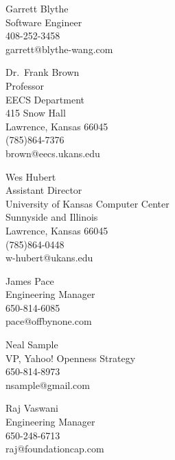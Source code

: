 \documentclass{resume}
\begin{document}
\address{
  {\tt mooreb@mooreb.com} \hfill 408-393-3124 (mobile) \hfill }

\begin{resume}

\begin{References}
\begin{reference}
Garrett Blythe \\
Software Engineer \\
408-252-3458 \\
garrett@blythe-wang.com \\
\end{reference}

\begin{reference}
Dr.\ Frank Brown \\
Professor \\
EECS Department \\
415 Snow Hall \\
Lawrence, Kansas 66045 \\
(785)864-7376 \\
brown@eecs.ukans.edu \\
\end{reference}

\begin{reference}
Wes Hubert \\
Assistant Director \\
University of Kansas Computer Center \\
Sunnyside and Illinois \\
Lawrence, Kansas 66045 \\
(785)864-0448 \\
w-hubert@ukans.edu \\
\end{reference}

\begin{reference}
James Pace \\
Engineering Manager \\
650-814-6085 \\
pace@offbynone.com \\
\end{reference}

\begin{reference}
Neal Sample \\
VP, Yahoo! Openness Strategy \\
650-814-8973 \\
nsample@gmail.com \\
\end{reference}

\begin{reference}
Raj Vaswani \\
Engineering Manager \\
650-248-6713 \\
raj@foundationcap.com \\
\end{reference}

\end{References}
\end{resume}
\end{document}
